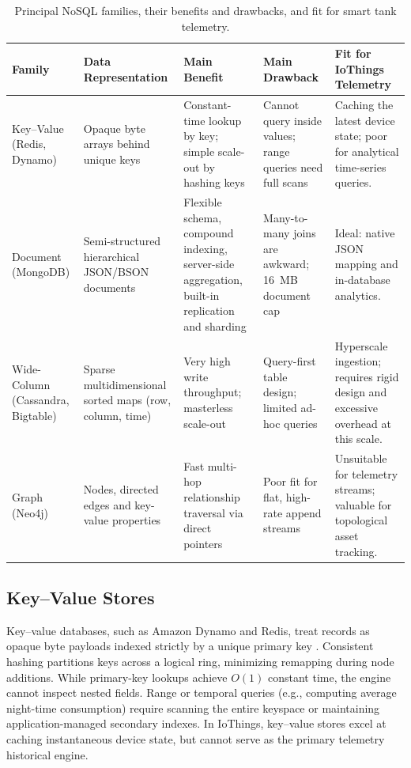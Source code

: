\documentclass[11pt,a4paper]{article}
\begin{document}
\begin{table}[htbp]
\centering\footnotesize
\caption{Principal NoSQL families, their benefits and drawbacks, and fit for smart tank telemetry.}\label{tab:families}
\renewcommand{\arraystretch}{1.3}
\begin{tabularx}{\textwidth}{|>{\raggedright\arraybackslash}p{1.9cm}|Y|Y|Y|Y|}
\hline
\textbf{Family} & \textbf{Data Representation} & \textbf{Main Benefit} & \textbf{Main Drawback} & \textbf{Fit for IoThings Telemetry}\\
\hline
Key--Value (Redis, Dynamo) & Opaque byte arrays behind unique keys & Constant-time lookup by key; simple scale-out by hashing keys & Cannot query inside values; range queries need full scans & Caching the latest device state; poor for analytical time-series queries.\\
\hline
Document (MongoDB) & Semi-structured hierarchical JSON/BSON documents & Flexible schema, compound indexing, server-side aggregation, built-in replication and sharding & Many-to-many joins are awkward; 16~MB document cap & Ideal: native JSON mapping and in-database analytics.\\
\hline
Wide-Column (Cassandra, Bigtable) & Sparse multidimensional sorted maps (row, column, time) & Very high write throughput; masterless scale-out & Query-first table design; limited ad-hoc queries & Hyperscale ingestion; requires rigid design and excessive overhead at this scale.\\
\hline
Graph (Neo4j) & Nodes, directed edges and key-value properties & Fast multi-hop relationship traversal via direct pointers & Poor fit for flat, high-rate append streams & Unsuitable for telemetry streams; valuable for topological asset tracking.\\
\hline
\end{tabularx}
\end{table}

\subsection{Key--Value Stores}
Key--value databases, such as Amazon Dynamo and Redis, treat records as opaque byte payloads indexed strictly by a unique primary key \citep{decandia2007}. Consistent hashing partitions keys across a logical ring, minimizing remapping during node additions. While primary-key lookups achieve $O(1)$ constant time, the engine cannot inspect nested fields. Range or temporal queries (e.g., computing average night-time consumption) require scanning the entire keyspace or maintaining application-managed secondary indexes. In IoThings, key--value stores excel at caching instantaneous device state, but cannot serve as the primary telemetry historical engine.
\end{document}

